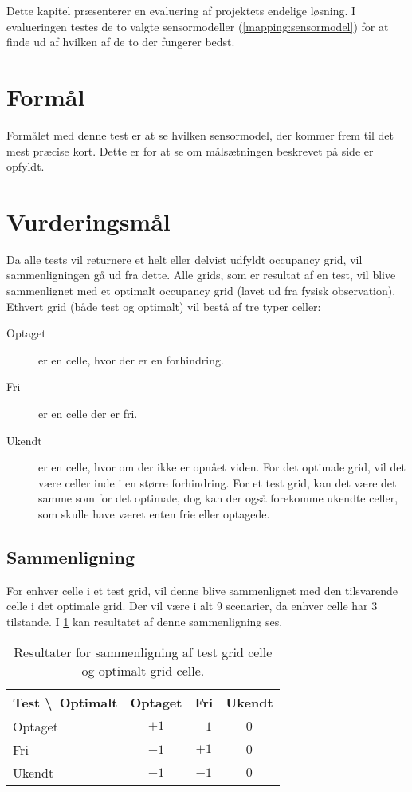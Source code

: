 Dette kapitel præsenterer en evaluering af projektets endelige løsning.
I evalueringen testes de to valgte sensormodeller (\cref{mapping:sensormodel}) for at finde ud af hvilken af de to der fungerer bedst.

\section{Formål}
Formålet med denne test er at se hvilken sensormodel, der kommer frem til det mest præcise kort.
Dette er for at se om målsætningen beskrevet på side \pageref{problem:maalsaetning} er opfyldt.

\section{Vurderingsmål}
Da alle tests vil returnere et helt eller delvist udfyldt occupancy grid, vil sammenligningen gå ud fra dette.
Alle grids, som er resultat af en test, vil blive sammenlignet med et optimalt occupancy grid (lavet ud fra fysisk observation).
Ethvert grid (både test og optimalt) vil bestå af tre typer celler:
\begin{description}
\item[Optaget]{ er en celle, hvor der er en forhindring.}
\item[Fri]{ er en celle der er fri.}
\item[Ukendt]{ er en celle, hvor om der ikke er opnået viden.
For det optimale grid, vil det være celler inde i en større forhindring.
For et test grid, kan det være det samme som for det optimale, dog kan der også forekomme ukendte celler, som skulle have været enten frie eller optagede.}
\end{description}

\subsection{Sammenligning}
For enhver celle i et test grid, vil denne blive sammenlignet med den tilsvarende celle i det optimale grid.
Der vil være i alt 9 scenarier, da enhver celle har 3 tilstande.
I \cref{evaluering:sammenligning} kan resultatet af denne sammenligning ses.

\begin{table}[h]
\centering
\begin{tabular}{|l|c|c|c|}
\hline
Test \textbackslash~Optimalt & Optaget & Fri & Ukendt \\ \hline
Optaget & $+1$ & $-1$ & $0$ \\ \hline
Fri & $-1$ & $+1$ & $0$ \\ \hline
Ukendt & $-1$ & $-1$ & $0$ \\ \hline
\end{tabular}
\caption{Resultater for sammenligning af test grid celle og optimalt grid celle.}
\label{evaluering:sammenligning}
\end{table}

